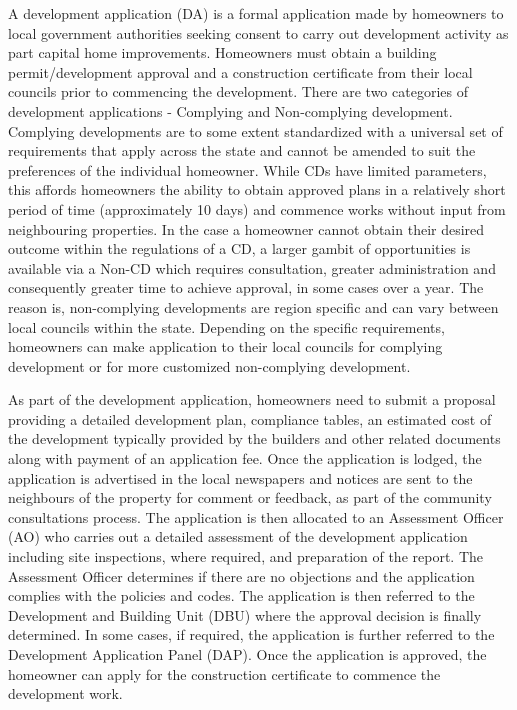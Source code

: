\documentclass[AEJ,reqno, draftmode]{AEA} %
\begin{document}
A development application (DA) is a formal application made by homeowners to local government authorities seeking consent to carry out development activity as part capital home improvements. Homeowners must obtain a building permit/development approval and a construction certificate from their local councils prior to commencing the development. There are two categories of development applications - Complying and Non-complying development. Complying developments are to some extent standardized with a universal set of requirements that apply across the state and cannot be amended to suit the preferences of the individual homeowner. While CDs have limited parameters, this affords homeowners the ability to obtain approved plans in a relatively short period of time (approximately 10 days) and commence works without input from neighbouring properties. In the case a homeowner cannot obtain their desired outcome within the regulations of a CD, a larger gambit of opportunities is available via a Non-CD which requires consultation, greater administration and consequently greater time to achieve approval, in some cases over a year. The reason is, non-complying developments are region specific and can vary between local councils within the state. Depending on the specific requirements, homeowners can make application to their local councils for complying development or for more customized non-complying development.

As part of the development application, homeowners need to submit a proposal providing a detailed development plan, compliance tables, an estimated cost of the development typically provided by the builders and other related documents along with payment of an application fee. Once the application is lodged, the application is advertised in the local newspapers and notices are sent to the neighbours of the property for comment or feedback, as part of the community consultations process. The application is then allocated to an Assessment Officer (AO) who carries out a detailed assessment of the development application including site inspections, where required, and preparation of the report. The Assessment Officer determines if there are no objections and the application complies with the policies and codes. The application is then referred to the Development and Building Unit (DBU) where the approval decision is finally determined. In some cases, if required, the application is further referred to the Development Application Panel (DAP). Once the application is approved, the homeowner can apply for the construction certificate to commence the development work.
\end{document}
